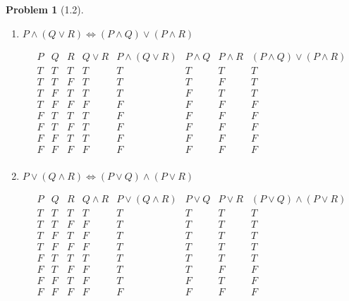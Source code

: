 \documentclass[12pt]{article}
\theoremstyle{definition}
\newtheorem{problem}{Problem}
\begin{document}
\begin{problem}[1.2]
\begin{enumerate}[label=(\alph*)]
        \item $P \land (Q \lor R) \iff (P \land Q) \lor (P \land R)$
        \begin{solution}
            \begin{displaymath}
                \begin{array}{c|c|c|c|c|c|c|c}
                P & Q & R & Q \lor R & P \land (Q \lor R) & P \land Q & P \land R & (P \land Q) \lor (P \land R)\\
                \hline
                T & T & T & T & T & T & T & T\\
                T & T & F & T & T & T & F & T\\
                T & F & T & T & T & F & T & T\\
                T & F & F & F & F & F & F & F\\
                F & T & T & T & F & F & F & F\\
                F & T & F & T & F & F & F & F\\
                F & F & T & T & F & F & F & F\\
                F & F & F & F & F & F & F & F\\
                \end{array}
            \end{displaymath}                
        \end{solution}

        \item $P \lor (Q \land R) \iff (P \lor Q) \land (P \lor R)$
        \begin{solution}
            \begin{displaymath}
                \begin{array}{c|c|c|c|c|c|c|c|c}
                P & Q & R & Q \land R & P \lor (Q \land R) & P \lor Q & P \lor R & (P \lor Q) \land (P \lor R)\\
                \hline
                T & T & T & T & T & T & T & T\\
                T & T & F & F & T & T & T & T\\
                T & F & T & F & T & T & T & T\\
                T & F & F & F & T & T & T & T\\
                F & T & T & T & T & T & T & T\\
                F & T & F & F & T & T & F & F\\
                F & F & T & F & T & F & T & F\\
                F & F & F & F & F & F & F & F\\
                \end{array}
            \end{displaymath}                
        \end{solution}
    \end{enumerate}
\end{problem}
\end{document}
